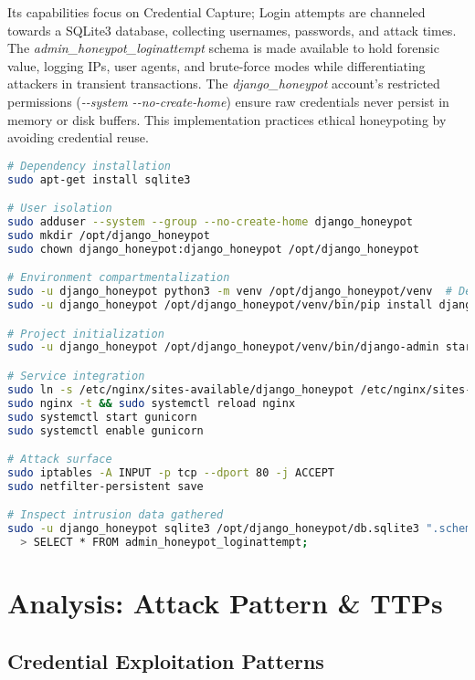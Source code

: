 \documentclass{cls/ULBreport}
\begin{document}
Its capabilities focus on Credential Capture; Login attempts are channeled towards a
SQLite3 database, collecting usernames, passwords, and attack times. The \textit{admin\_honeypot\_loginattempt} schema is made available to hold forensic
value, logging IPs, user agents, and brute-force modes while differentiating attackers in transient transactions. The \textit{django\_honeypot} account's restricted permissions (\textit{-{-}system -{-}no-create-home}) ensure raw credentials never persist in memory or disk buffers. This implementation practices ethical honeypoting by avoiding credential reuse.
    
\begin{lstlisting}[language=bash,label={lst:cowrie-context},caption={Ubuntu Setup of a Django Honeypot Webservice}]  
# Dependency installation
sudo apt-get install sqlite3

# User isolation
sudo adduser --system --group --no-create-home django_honeypot
sudo mkdir /opt/django_honeypot
sudo chown django_honeypot:django_honeypot /opt/django_honeypot

# Environment compartmentalization
sudo -u django_honeypot python3 -m venv /opt/django_honeypot/venv  # Dependency isolation
sudo -u django_honeypot /opt/django_honeypot/venv/bin/pip install django django-admin-honeypot gunicorn

# Project initialization
sudo -u django_honeypot /opt/django_honeypot/venv/bin/django-admin startproject honeypot_project /opt/django_honeypot

# Service integration
sudo ln -s /etc/nginx/sites-available/django_honeypot /etc/nginx/sites-enabled/ # Exposure
sudo nginx -t && sudo systemctl reload nginx
sudo systemctl start gunicorn
sudo systemctl enable gunicorn

# Attack surface
sudo iptables -A INPUT -p tcp --dport 80 -j ACCEPT
sudo netfilter-persistent save

# Inspect intrusion data gathered
sudo -u django_honeypot sqlite3 /opt/django_honeypot/db.sqlite3 ".schema admin_honeypot_loginattempt"  # Verify capture schema
  > SELECT * FROM admin_honeypot_loginattempt;
\end{lstlisting}  


\section{Analysis: Attack Pattern \& TTPs}

\subsection{Credential Exploitation Patterns}
\end{document}
